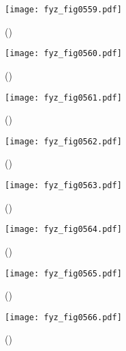     \begin{figure}[ht!] %
      \centering
      \texttt{[image: fyz\_fig0559.pdf]}
      \caption{
               (\cite[s.~707]{Feynman02})}
      \label{fyz:fig0559}
    \end{figure}

    \begin{figure}[ht!] %
      \centering
      \texttt{[image: fyz\_fig0560.pdf]}
      \caption{
               (\cite[s.~707]{Feynman02})}
      \label{fyz:fig0560}
    \end{figure}

    \begin{figure}[ht!] %
      \centering
      \texttt{[image: fyz\_fig0561.pdf]}
      \caption{
               (\cite[s.~707]{Feynman02})}
      \label{fyz:fig0561}
    \end{figure}

    \begin{figure}[ht!] %
      \centering
      \texttt{[image: fyz\_fig0562.pdf]}
      \caption{
               (\cite[s.~707]{Feynman02})}
      \label{fyz:fig0562}
    \end{figure}

    \begin{figure}[ht!] %
      \centering
      \texttt{[image: fyz\_fig0563.pdf]}
      \caption{
               (\cite[s.~707]{Feynman02})}
      \label{fyz:fig0563}
    \end{figure}

    \begin{figure}[ht!] %
      \centering
      \texttt{[image: fyz\_fig0564.pdf]}
      \caption{
               (\cite[s.~707]{Feynman02})}
      \label{fyz:fig0564}
    \end{figure}

    \begin{figure}[ht!] %
      \centering
      \texttt{[image: fyz\_fig0565.pdf]}
      \caption{
               (\cite[s.~707]{Feynman02})}
      \label{fyz:fig0565}
    \end{figure}

    \begin{figure}[ht!] %
      \centering
      \texttt{[image: fyz\_fig0566.pdf]}
      \caption{
               (\cite[s.~707]{Feynman02})}
      \label{fyz:fig0566}
    \end{figure}

